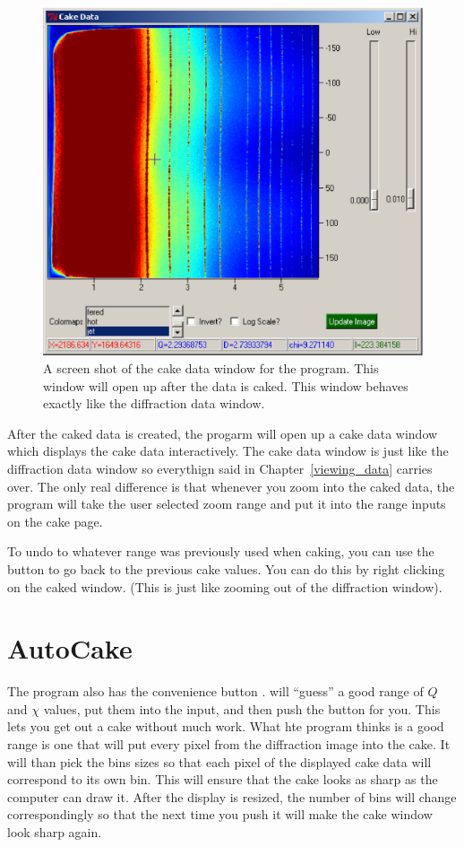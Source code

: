 \begin{figure}
    \centering
    \includegraphics[scale=.75]{figures/cake_data_window.eps}
    \caption{A screen shot of the cake data window for
    the program. This window will open up after the
    data is caked. This window behaves exactly like 
    the diffraction data window.} 
    \label{cake_data_window}
\end{figure}

After the caked data is created, the progarm will open up a cake data
window which displays the cake data interactively.
The cake data window is just like the diffraction
data window so everythign said in Chapter~\ref{viewing_data} 
carries over. The only real difference is that whenever
you zoom into the caked data, the program will take the user
selected zoom range and put it into the range inputs on
the cake page.

To undo to whatever range was previously used when caking, 
you can use the  button to go back to the
previous cake values. You can do this by 
right clicking on the caked window. (This is just like
zooming out of the diffraction window). 

\section{AutoCake}

The program also has the convenience button .
 will ``guess'' a good range of $Q$ and $\chi$ 
values, put them into the input, and then push the 
 button for you. This lets you get out a 
cake without much work. What hte program thinks is a
good range is one that will put every pixel from the 
diffraction image into the cake. It will than pick
the bins sizes so that each pixel of the displayed 
cake data will correspond to its own bin. This will ensure
that the cake looks as sharp as the computer can draw it.
After the display is resized, the number of bins will
change correspondingly so that the next time you push
 it will make the cake window look sharp again.

